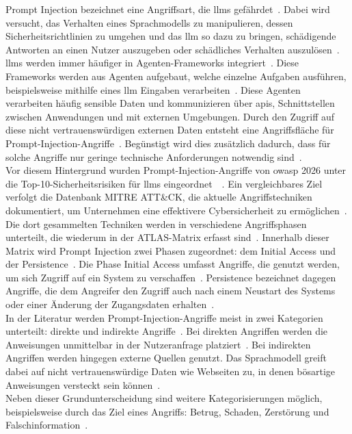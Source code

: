 Prompt Injection bezeichnet eine Angriffsart, die \acp{llm} gefährdet~\cite[54]{pi1}. Dabei wird versucht, das Verhalten eines Sprachmodells zu manipulieren, dessen
Sicherheitsrichtlinien zu umgehen und das \ac{llm} so dazu zu bringen, schädigende Antworten an einen Nutzer auszugeben
oder schädliches Verhalten auszulösen~\cite[11]{pi2}. \\
\acp{llm} werden immer häufiger in Agenten-Frameworks integriert~\cite[10471\psq]{pi4}. Diese Frameworks werden aus Agenten aufgebaut, welche 
einzelne Aufgaben ausführen, beispielsweise mithilfe eines \ac{llm} Eingaben verarbeiten~\cite{pi30}. Diese Agenten verarbeiten häufig sensible Daten und
kommunizieren über \acp{api}, Schnittstellen zwischen Anwendungen und mit externen Umgebungen. 
Durch den Zugriff auf diese nicht vertrauenswürdigen externen Daten entsteht eine Angriffsfläche für Prompt-Injection-Angriffe~\cite[1\psq]{pi5}. 
Begünstigt wird dies zusätzlich dadurch, dass
für solche Angriffe nur geringe technische Anforderungen notwendig sind~\cite[10471\psq]{pi4}. \\
Vor diesem Hintergrund wurden Prompt-Injection-Angriffe von \ac{owasp} 2026 unter die Top-10-Sicherheitsrisiken für \acp{llm} eingeordnet~\cite[9]{pi24}~\cite[2]{pi11}.
Ein vergleichbares Ziel verfolgt die Datenbank MITRE ATT\&CK, die aktuelle Angriffstechniken dokumentiert, um Unternehmen eine effektivere Cybersicherheit zu
ermöglichen~\cite{pi26}. Die dort gesammelten Techniken werden in verschiedene Angriffsphasen unterteilt, die wiederum in der ATLAS-Matrix erfasst sind~\cite[12878]{pi8}.
Innerhalb dieser Matrix wird Prompt Injection zwei Phasen zugeordnet: dem Initial Access und der Persistence~\cite{pi27}. Die Phase Initial Access umfasst Angriffe,
die genutzt werden, um sich Zugriff auf ein System zu verschaffen~\cite{pi28}. Persistence bezeichnet dagegen Angriffe, die dem Angreifer den Zugriff auch nach einem Neustart des
Systems oder einer Änderung der Zugangsdaten erhalten~\cite{pi29}. \\
In der Literatur werden Prompt-Injection-Angriffe meist in zwei Kategorien unterteilt: direkte und indirekte Angriffe~\cite[55]{pi1}. Bei direkten Angriffen werden die Anweisungen
unmittelbar in der Nutzeranfrage platziert~\cite[2]{pi9}. Bei indirekten Angriffen werden hingegen externe Quellen genutzt. Das Sprachmodell greift dabei auf nicht
vertrauenswürdige Daten wie Webseiten zu, in denen bösartige Anweisungen versteckt sein können~\cite[2\psq]{pi6}. \\
Neben dieser Grundunterscheidung sind weitere Kategorisierungen möglich, beispielsweise durch das Ziel eines Angriffs: Betrug, Schaden, Zerstörung und Falschinformation~\cite[12880]{pi8}. 
